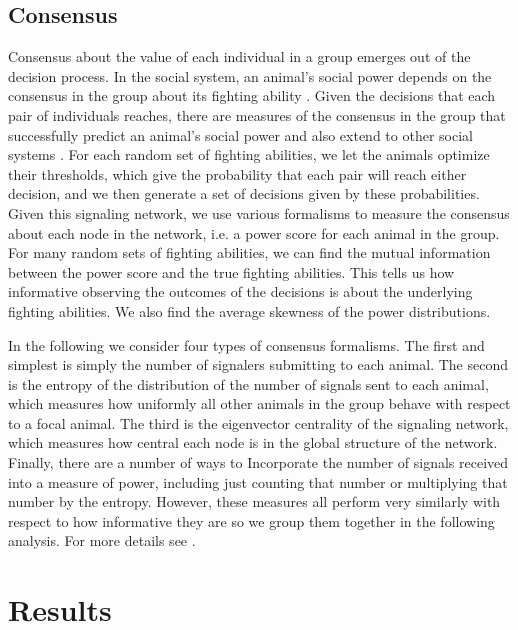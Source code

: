 \documentclass{article}
\begin{document}
\subsection{Consensus }
Consensus about the value of each individual in a group emerges out of the decision process.  In the social system, an animal's social power depends on the consensus in the group about its fighting ability \cite{Flack:2004oq,Flack:2006uq,Brush:2013fk}.  Given the decisions that each pair of individuals reaches, there are measures of the consensus in the group that successfully predict an animal's social power and also extend to other social systems \cite{Brush:2013fk}.  For each random set of fighting abilities, we let the animals optimize their thresholds, which give the probability that each pair will reach either decision, and we then generate a set of decisions given by these probabilities.  Given this signaling network, we use various formalisms to measure the consensus about each node in the network, i.e. a power score for each animal in the group.  For many random sets of fighting abilities, we can find the mutual information between the power score and the true fighting abilities. This tells us how informative observing the outcomes of the decisions is about the underlying fighting abilities.  We also find the average skewness of the power distributions.

In the following we consider four types of consensus formalisms.  The first and simplest is simply the number of signalers submitting to each animal.  The second is the entropy of the distribution of the number of signals sent to each animal, which measures how uniformly all other animals in the group behave with respect to a focal animal.  The third is the eigenvector centrality of the signaling network, which measures how central each node is in the global structure of the network.  Finally, there are a number of ways to Incorporate the number of signals received into a measure of power, including just counting that number or multiplying that number by the entropy.  However, these measures all perform very similarly with respect to how informative they are so we group them together in the following analysis.  For more details see \cite{Brush:2013fk}.  

\section{Results}
\end{document}
